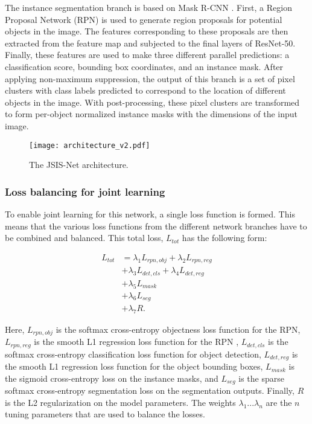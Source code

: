 \documentclass[10pt,twocolumn,letterpaper]{article}
\begin{document}
The instance segmentation branch is based on Mask R-CNN \cite{He2017}. First, a Region Proposal Network (RPN) is used to generate region proposals for potential objects in the image. The features corresponding to these proposals are then extracted from the feature map and subjected to the final layers of ResNet-50. Finally, these features are used to make three different parallel predictions: a classification score, bounding box coordinates, and an instance mask. After applying non-maximum suppression, the output of this branch is a set of pixel clusters with class labels predicted to correspond to the location of different objects in the image. With post-processing, these pixel clusters are transformed to form per-object normalized instance masks with the dimensions of the input image.

\begin{figure}[t]
\centering
\texttt{[image: architecture\_v2.pdf]}
\caption{The JSIS-Net architecture.}
\label{fig:architecture}
\end{figure}

\subsubsection{Loss balancing for joint learning} 
To enable joint learning for this network, a single loss function is formed. This means that the various loss functions from the different network branches have to be combined and balanced. This total loss, $L_{tot}$ has the following form:

\begin{equation*}
\begin{aligned}
L_{tot} &= {\lambda_1}{L_{rpn,obj}} + {\lambda_2}{L_{rpn,reg}} \\ &+
{\lambda_3}{L_{det,cls}} + {\lambda_4}{L_{det,reg}} \\ &+
{\lambda_5}{L_{mask}} \\ &+ {\lambda_6}{L_{seg}} \\ &+  {\lambda_7}{R}.
\end{aligned}
\end{equation*}


Here, $L_{rpn,obj}$ is the softmax cross-entropy objectness loss function for the RPN, $L_{rpn,reg}$ is the smooth L1 regression loss function for the RPN \cite{Girshick2015}, $L_{det,cls}$ is the softmax cross-entropy classification loss function for object detection, $L_{det,reg}$ is the smooth L1 regression loss function for the object bounding boxes, $L_{mask}$ is the sigmoid cross-entropy loss on the instance masks, and $L_{seg}$ is the sparse softmax cross-entropy segmentation loss on the segmentation outputs. Finally, $R$ is the L2 regularization on the model parameters. The weights $\lambda_1...\lambda_n$ are the $n$ tuning parameters that are used to balance the losses.
\end{document}
